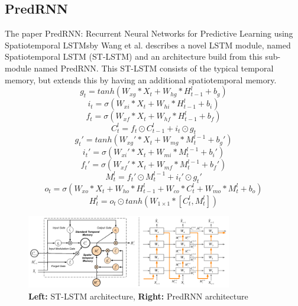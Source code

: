  \subsection{PredRNN} \label{subsection::PredRNN}
  The paper \glqq PredRNN: Recurrent Neural Networks for Predictive Learning using Spatiotemporal LSTMs\grqq by Wang et al. \cite{Wang2017} describes a novel
  LSTM module, named Spatiotemporal LSTM (ST-LSTM) and an architecture build from this sub-module named PredRNN.
  This ST-LSTM consists of the typical temporal memory, but extends this by having an additional spatiotemporal memory.
  \begin{equation}
   g_t = tanh(W_{xg} \ast X_t + W_{hg} \ast H_{t-1}^l + b_g)
  \end{equation}
  \begin{equation}
   i_t = \sigma(W_{xi} \ast X_t + W_{hi} \ast H_{t-1}^l +b_i)
  \end{equation}
  \begin{equation}
   f_t = \sigma(W_{xf} \ast X_t + W_{hf} \ast H_{t-1}^l + b_f)
  \end{equation}
  \begin{equation}
   C_t^l = f_t \odot C_{t-1}^l + i_t \odot g_t
  \end{equation}
  \begin{equation}
   g_t\prime = tanh(W_{xg}\prime \ast X_t + W_{mg} \ast M_t^{l-1} + b_g\prime)
  \end{equation}
  \begin{equation}
   i_t\prime = \sigma(W_{xi}\prime \ast X_t + W_{mi} \ast M_t^{l-1} + b_i\prime)
  \end{equation}
  \begin{equation}
   f_t\prime = \sigma(W_{xf}\prime \ast X_t + W_{mf} \ast M_t^{l-1} + b_f\prime)
  \end{equation}
  \begin{equation}
   M_t^l = f_t\prime \odot M_t^{l-1} + i_t\prime \odot g_t\prime
  \end{equation}
  \begin{equation}
   o_t = \sigma(W_{xo} \ast X_t + W_{ho} \ast H_{t-1}^l + W_{co} \ast C_t^l + W_{mo} \ast M_t^l + b_o)
  \end{equation}
  \begin{equation}
   H_t^l = o_t \odot tanh(W_{1 \times 1} \ast [C_t^l, M_t^l])
  \end{equation}
  \begin{figure}[H]
   \includegraphics[width=0.8\textwidth]{../Images/wang.png}
   \centering
   \caption{\textbf{Left:} ST-LSTM architecture, \textbf{Right:} PredRNN architecture \cite{Wang2017}}
   \label{fig:wang_architecture}
  \end{figure}\noindent
